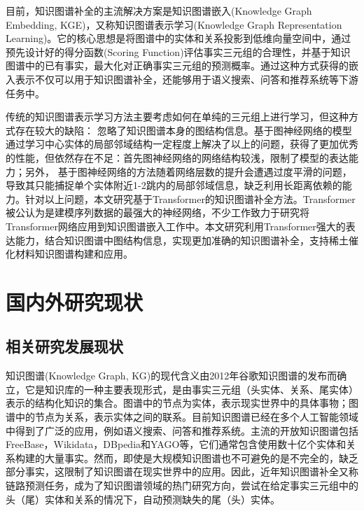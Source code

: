 目前，知识图谱补全的主流解决方案是知识图谱嵌入(Knowledge Graph Embedding, KGE)，又称知识图谱表示学习(Knowledge Graph Representation Learning)。它的核心思想是将图谱中的实体和关系投影到低维向量空间中，通过预先设计好的得分函数(Scoring Function)评估事实三元组的合理性，并基于知识图谱中的已有事实，最大化对正确事实三元组的预测概率。通过这种方式获得的嵌入表示不仅可以用于知识图谱补全，还能够用于语义搜索、问答和推荐系统等下游任务中。

传统的知识图谱表示学习方法主要考虑如何在单纯的三元组上进行学习，但这种方式存在较大的缺陷：
忽略了知识图谱本身的图结构信息。基于图神经网络的模型通过学习中心实体的局部邻域结构一定程度上解决了以上的问题，获得了更加优秀的性能，但依然存在不足：首先图神经网络的网络结构较浅，限制了模型的表达能力；另外，
基于图神经网络的方法随着网络层数的提升会遭遇过度平滑的问题，导致其只能捕捉单个实体附近1-2跳内的局部邻域信息，缺乏利用长距离依赖的能力。针对以上问题，本文研究基于Transformer的知识图谱补全方法。Transformer被公认为是建模序列数据的最强大的神经网络，不少工作致力于研究将Transformer网络应用到知识图谱嵌入工作中。本文研究利用Transformer强大的表达能力，结合知识图谱中图结构信息，实现更加准确的知识图谱补全，支持稀土催化材料知识图谱构建和应用。


\section{国内外研究现状}

\subsection{相关研究发展现状}
知识图谱(Knowledge Graph, KG)的现代含义由2012年谷歌知识图谱的发布而确立，它是知识库的一种主要表现形式，是由事实三元组（头实体、关系、尾实体）表示的结构化知识的集合。图谱中的节点为实体，表示现实世界中的具体事物；图谱中的节点为关系，表示实体之间的联系。目前知识图谱已经在多个人工智能领域中得到了广泛的应用，例如语义搜索、问答和推荐系统。主流的开放知识图谱包括FreeBase，Wikidata，DBpedia和YAGO等，它们通常包含使用数十亿个实体和关系构建的大量事实。然而，即使是大规模知识图谱也不可避免的是不完全的，缺乏部分事实，这限制了知识图谱在现实世界中的应用。因此，近年知识图谱补全又称链路预测任务，成为了知识图谱领域的热门研究方向，尝试在给定事实三元组中的头（尾）实体和关系的情况下，自动预测缺失的尾（头）实体。

